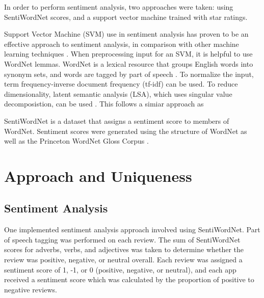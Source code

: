 \documentclass{acm_proc_article-sp}
\begin{document}
In order to perform sentiment analysis, two approaches were taken: using SentiWordNet scores, and a support vector machine trained with star ratings.

Support Vector Machine (SVM) use in sentiment analysis has proven to be an effective approach to sentiment analysis, in comparison with other machine learning techniques \cite{Pang02thumbsup}.  When preprocessing input for an SVM, it is helpful to use WordNet lemmas.  WordNet is a lexical resource that groups English words into synonym sets, and words are tagged by part of speech \cite{Miller}.  To normalize the input, term frequency-inverse document frequency (tf-idf) can be used.  To reduce dimensionality, latent semantic analysis (LSA), which uses singular value decomposistion, can be used \cite{Deerwester90indexingby}.  This follows a simiar approach as \cite{Mullen04sentimentanalysis}

SentiWordNet is a dataset that assigns a sentiment score to members of WordNet.  Sentiment scores were generated using the structure of WordNet as well as the Princeton WordNet Gloss Corpus \cite{Baccianella10sentiwordnet}.


\section{Approach and Uniqueness}

\subsection{Sentiment Analysis}
One implemented sentiment analysis approach involved using SentiWordNet.  Part of speech tagging was performed on each review. The sum of SentiWordNet scores for adverbs, verbs, and adjectives was taken to determine whether the review was positive, negative, or neutral overall.  Each review was assigned a sentiment score of 1, -1, or 0 (positive, negative, or neutral), and each app received a sentiment score which was calculated by the proportion of positive to negative reviews.
\end{document}
